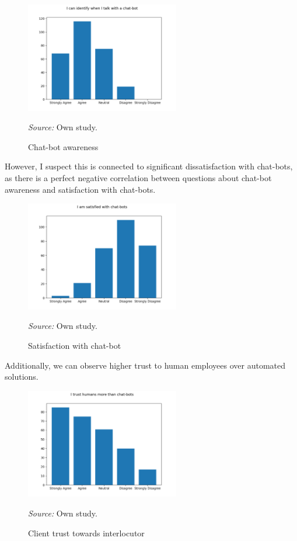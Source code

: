\begin{figure}
    \centering
    \includegraphics[width=0.6\textwidth,height=\textheight,keepaspectratio]{survey/7_i_can_identify_when_i_talk_with_a_chat-bot.png}
    \caption{Chat-bot awareness}
    \medskip
    \footnotesize\textit{Source:} Own study.
\end{figure}

However, I suspect this is connected to significant dissatisfaction with chat-bots, as there is a perfect negative correlation between questions about chat-bot awareness and satisfaction with chat-bots.

\begin{figure}
    \centering
    \includegraphics[width=0.6\textwidth,height=\textheight,keepaspectratio]{survey/8_i_am_satisfied_with_chat-bots.png}
    \caption{Satisfaction with chat-bot}
    \medskip
    \footnotesize\textit{Source:} Own study.
\end{figure}

Additionally, we can observe higher trust to human employees over automated solutions.

\begin{figure}
    \centering
    \includegraphics[width=0.6\textwidth,height=\textheight,keepaspectratio]{survey/9_i_trust_humans_more_than_chat-bots.png}
    \caption{Client trust towards interlocutor}
    \medskip
    \footnotesize\textit{Source:} Own study.
\end{figure}

